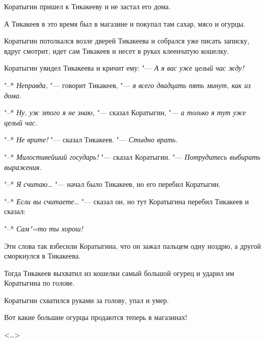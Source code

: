 Коратыгин пришел к Тикакееву и не застал его дома.

А Тикакеев в это время был в магазине и покупал там сахар, мясо и огурцы.

Коратыгин потолкался возле дверей Тикакеева и собрался уже писать записку, вдруг смотрит, идет сам Тикакеев и несет в руках клеенчатую кошелку.

Коратыгин увидел Тикакеева и кричит ему: "--- \textit{А я вас уже целый час жду!}

"--* \textit{Неправда}, "--- говорит Тикакеев, "--- \textit{я всего двадцать пять минут, как из дома.}

"--* \textit{Ну, уж этого я не знаю,} "--- сказал Коратыгин, "--- \textit{а только я тут уже целый час.}

"--* \textit{Не врите!} "--- сказал Тикакеев. "--- \textit{Стыдно врать.}

"--* \textit{Милостивейший государь!} "--- сказал Коратыгин. "--- \textit{Потрудитесь выбирать выражения.}

"--* \textit{Я считаю\dots} "--- начал было Тикакеев, но его перебил Коратыгин.

"--* \textit{Если вы считаете\dots} "--- сказал он, но тут Коратыгина перебил Тикакеев и сказал:

"--* \textit{Сам"=то ты хорош!}

Эти слова так взбесили Коратыгина, что он зажал пальцем одну ноздрю, а другой сморкнулся в Тикакеева.

Тогда Тикакеев выхватил из кошелки самый большой огурец и ударил им Коратыгина по голове.

Коратыгин схватился руками за голову, упал и умер.

Вот какие большие огурцы продаются теперь в магазинах!

\begin{flushright} <\dots> \end{flushright}
